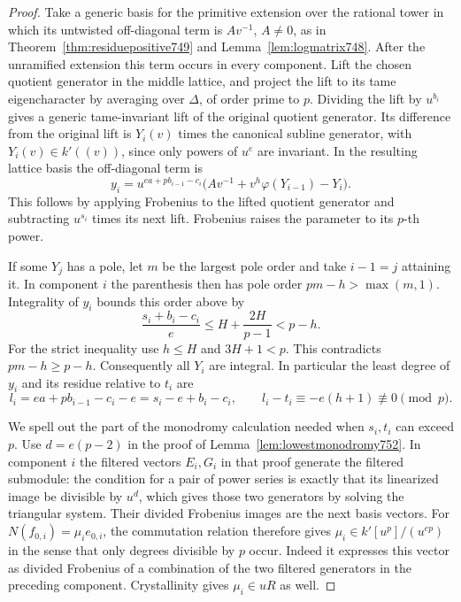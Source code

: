 \documentclass[a4paper,11pt]{article}
\theoremstyle{definition}
\theoremstyle{remark}
\numberwithin{equation}{section}
\begin{document}
\begin{proof}
Take a generic basis for the primitive extension over the
rational tower in which its untwisted off-diagonal term is
\(A v^{-1}\), \(A\ne0\), as in Theorem~\ref{thm:residuepositive749}
and Lemma~\ref{lem:logmatrix748}. After the unramified extension
this term occurs in every component. Lift the chosen quotient
generator in the middle lattice, and project the lift to its
tame eigencharacter by averaging over \(\Delta\), of order
prime to \(p\). Dividing the lift by \(u^{b_i}\) gives a generic
tame-invariant lift of the original quotient generator.
Its difference from the original lift is \(Y_i(v)\) times
the canonical subline generator, with \(Y_i(v)\in k'((v))\),
since only powers of \(u^e\) are invariant. In the resulting
lattice basis the off-diagonal term is
\[
 y_i=u^{ea+p b_{i-1}-c_i}
       \big(A v^{-1}+v^h\varphi(Y_{i-1})-Y_i\big).
\]
This follows by applying Frobenius to the lifted quotient
generator and subtracting \(u^{s_i}\) times its next lift.
Frobenius raises the parameter to its \(p\)-th power.

If some \(Y_j\) has a pole, let \(m\) be the largest pole order
and take \(i-1=j\) attaining it. In component \(i\) the
parenthesis then has pole order \(pm-h>\max(m,1)\).
Integrality of \(y_i\) bounds this order above by
\[
 \frac{s_i+b_i-c_i}{e}\le H+\frac{2H}{p-1}<p-h.
\]
For the strict inequality use \(h\le H\) and \(3H+1<p\).
This contradicts \(pm-h\ge p-h\). Consequently all
\(Y_i\) are integral. In particular the least degree of \(y_i\)
and its residue relative to \(t_i\) are
\[
 l_i=ea+p b_{i-1}-c_i-e=s_i-e+b_i-c_i,\qquad
 l_i-t_i\equiv -e(h+1)\not\equiv0\pmod p .
\]

We spell out the part of the monodromy calculation needed when
\(s_i,t_i\) can exceed \(p\). Use \(d=e(p-2)\) in the proof
of Lemma~\ref{lem:lowestmonodromy752}. In component \(i\) the
filtered vectors \(E_i,G_i\) in that proof generate the
filtered submodule: the condition for a pair of power series
is exactly that its linearized image be divisible by \(u^d\),
which gives those two generators by solving the triangular
system. Their divided Frobenius images are the next basis
vectors. For \(N(f_{0,i})=\mu_i e_{0,i}\), the commutation
relation therefore gives \(\mu_i\in k'[u^p]/(u^{ep})\) in the
sense that only degrees divisible by \(p\) occur. Indeed it
expresses this vector as divided Frobenius of a combination of
the two filtered generators in the preceding component.
Crystallinity gives \(\mu_i\in uR\) as well.


\end{proof}
\end{document}

